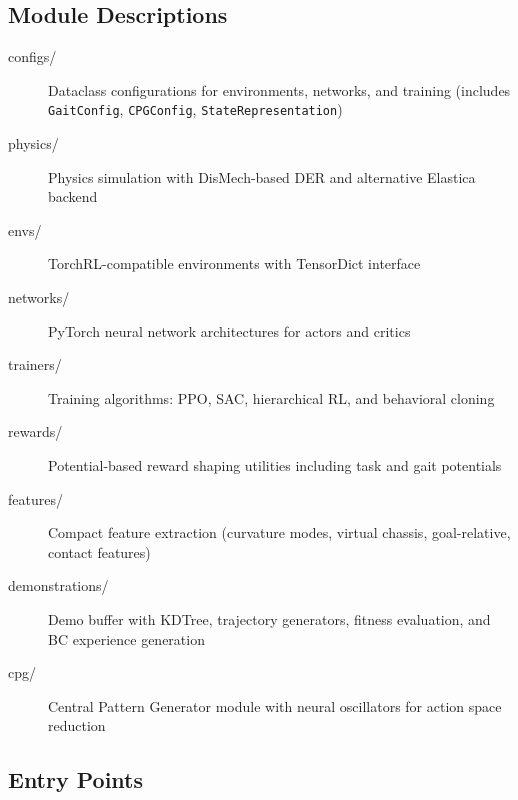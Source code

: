 \documentclass[11pt]{article}
\begin{document}
\subsection{Module Descriptions}

\begin{description}
    \item[configs/] Dataclass configurations for environments, networks, and training (includes \texttt{GaitConfig}, \texttt{CPGConfig}, \texttt{StateRepresentation})
    \item[physics/] Physics simulation with DisMech-based DER and alternative Elastica backend
    \item[envs/] TorchRL-compatible environments with TensorDict interface
    \item[networks/] PyTorch neural network architectures for actors and critics
    \item[trainers/] Training algorithms: PPO, SAC, hierarchical RL, and behavioral cloning
    \item[rewards/] Potential-based reward shaping utilities including task and gait potentials
    \item[features/] Compact feature extraction (curvature modes, virtual chassis, goal-relative, contact features)
    \item[demonstrations/] Demo buffer with KDTree, trajectory generators, fitness evaluation, and BC experience generation
    \item[cpg/] Central Pattern Generator module with neural oscillators for action space reduction
\end{description}

\subsection{Entry Points}
\end{document}

